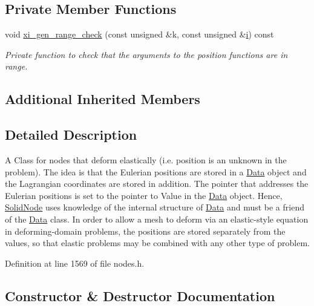 \subsection*{Private Member Functions}
\begin{DoxyCompactItemize}
\item 
void \hyperlink{classoomph_1_1SolidNode_a0c5b916610af540ccc98a09584b8f34f}{xi\+\_\+gen\+\_\+range\+\_\+check} (const unsigned \&k, const unsigned \&\hyperlink{cfortran_8h_adb50e893b86b3e55e751a42eab3cba82}{i}) const
\begin{DoxyCompactList}\small\item\em Private function to check that the arguments to the position functions are in range. \end{DoxyCompactList}\end{DoxyCompactItemize}
\subsection*{Additional Inherited Members}


\subsection{Detailed Description}
A Class for nodes that deform elastically (i.\+e. position is an unknown in the problem). The idea is that the Eulerian positions are stored in a \hyperlink{classoomph_1_1Data}{Data} object and the Lagrangian coordinates are stored in addition. The pointer that addresses the Eulerian positions is set to the pointer to Value in the \hyperlink{classoomph_1_1Data}{Data} object. Hence, \hyperlink{classoomph_1_1SolidNode}{Solid\+Node} uses knowledge of the internal structure of \hyperlink{classoomph_1_1Data}{Data} and must be a friend of the \hyperlink{classoomph_1_1Data}{Data} class. In order to allow a mesh to deform via an elastic-\/style equation in deforming-\/domain problems, the positions are stored separately from the values, so that elastic problems may be combined with any other type of problem. 

Definition at line 1569 of file nodes.\+h.



\subsection{Constructor \& Destructor Documentation}
\mbox{\label{classoomph_1_1SolidNode_a7f6839c0a4abd087be6a68601b558da2}} 

